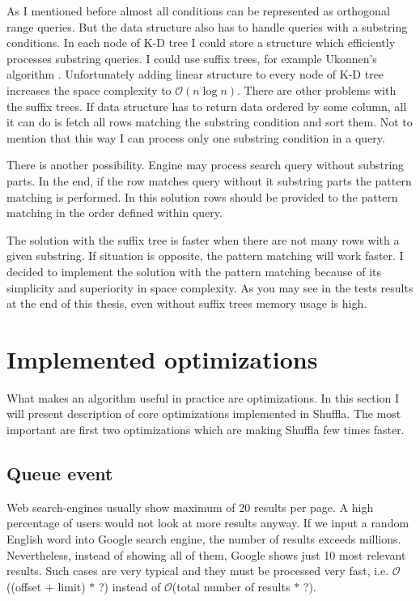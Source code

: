 \documentclass[10pt,a4paper]{article}
\newcommand{\Oh}{\mathcal{O}}
\begin{document}
\bigskip

As I mentioned before almost all conditions can be represented as orthogonal range queries. But the data structure also has to handle queries with a substring conditions. In each node of K-D tree I could store a structure which efficiently processes substring queries. I could use suffix trees, for example Ukonnen's algorithm \cite{STUKK}. Unfortunately adding linear structure to every node of K-D tree increases the space complexity to $\Oh(n \log n)$. There are other problems with the suffix trees. If data structure has to return data ordered by some column, all it can do is fetch all rows matching the substring condition and sort them. Not to mention that this way I can process only one substring condition in a query.

There is another possibility. Engine may process search query without substring parts. In the end, if the row matches query without it substring parts the pattern matching is performed. In this solution rows should be provided to the pattern matching in the order defined within query.

The solution with the suffix tree is faster when there are not many rows with a given substring. If situation is opposite, the pattern matching will work faster. I decided to implement the solution with the pattern matching because of its simplicity and superiority in space complexity. As you may see in the tests results at the end of this thesis, even without suffix trees memory usage is high. 

\section{Implemented optimizations}
\label{chapter:opt}

What makes an algorithm useful in practice are optimizations. In this section I will present description of core optimizations implemented in Shuffla. The most important are first two optimizations which are making Shuffla few times faster.

\subsection{Queue event}
Web search-engines usually show maximum of 20 results per page. A high percentage of users would not look at more results anyway. If we input a random English word into Google search engine, the number of results exceeds millions. Nevertheless, instead of showing all of them, Google shows just 10 most relevant results. Such cases are very typical and they must be processed very fast, i.e. $\Oh$((offset + limit) $*$ ?) instead of $\Oh$(total number of results $*$ ?).
\end{document}
